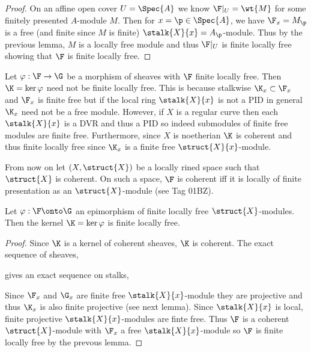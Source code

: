 \documentclass[12pt]{article}
\begin{document}
\begin{proof}
On an affine open cover $U = \Spec{A}$ we know $\F|_U = \wt{M}$ for some finitely presented $A$-module $M$. Then for $x = \p \in \Spec{A}$, we have $\F_x = M_\p$ is a free (and finite since $M$ is finite) $\stalk{X}{x} = A_\p$-module. Thus by the previous lemma, $M$ is a locally free module and thus $\F|_U$ is finite locally free showing that $\F$ is finite locally free.
\end{proof}

\begin{example}
Let $\varphi : \F \to \G$ be a morphism of sheaves with $\F$ finite locally free. Then $\K = \ker{\varphi}$ need not be finite locally free. This is because stalkwise $\K_x \subset \F_x$ and $\F_x$ is finite free but if the local ring $\stalk{X}{x}$ is not a PID in general $\K_x$ need not be a free module. However, if $X$ is a regular curve then each $\stalk{X}{x}$ is a DVR and thus a PID so indeed submodules of finite free modules are finite free. Furthermore, since $X$ is noetherian $\K$ is coherent and thus finite locally free since $\K_x$ is a finite free $\struct{X}{x}$-module.
\end{example}

\begin{rmk}
From now on let $(X, \struct{X})$ be a locally rined space such that $\struct{X}$ is coherent. On such a space, $\F$ is coherent iff it is locally of finite presentation as an $\struct{X}$-module (see Tag 01BZ).
\end{rmk}

\begin{prop}
Let $\varphi : \F \onto \G$ an epimorphism of finite locally free $\struct{X}$-modules. Then the kernel $\K = \ker{\varphi}$ is finite locally free.
\end{prop}

\begin{proof}
Since $\K$ is a kernel of coherent sheaves, $\K$ is coherent.
The exact sequence of sheaves,
\begin{center}
\end{center}
gives an exact sequence on stalks,
\begin{center}
\end{center}
Since $\F_x$ and $\G_x$ are finite free $\stalk{X}{x}$-module they are projective and thus $\K_x$ is also finite projective (see next lemma). Since $\stalk{X}{x}$ is local, finite projective $\stalk{X}{x}$-modules are finte free. Thus $\F$ is a coherent $\struct{X}$-module with $\F_x$ a free $\stalk{X}{x}$-module so $\F$ is finite locally free by the prevous lemma.
\end{proof}
\end{document}
